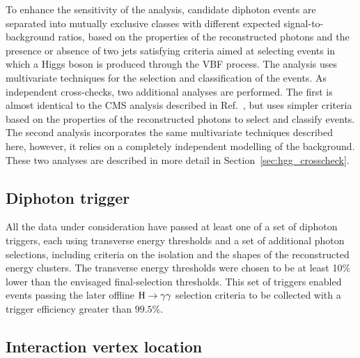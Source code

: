 \documentclass[12pt,twoside,a4paper,cmspaper,final,collab]{cms-tdr}
\begin{document}
To enhance the sensitivity of the analysis, candidate diphoton events are separated into mutually
exclusive classes with different expected signal-to-background ratios,
based on the properties of the reconstructed photons and
the presence or absence of two jets satisfying criteria aimed at selecting events
in which a Higgs boson is produced through the VBF process.
The analysis uses multivariate techniques
for the selection and classification of the events.
As independent cross-checks, two additional analyses are performed.
The first is almost identical to the CMS analysis described in Ref.~\cite{Chatrchyan:2012tw},
but uses simpler criteria based on the properties of the reconstructed photons to
select and classify events. The second analysis incorporates the same multivariate techniques
described here, however, it relies on a completely independent modelling of the background.
These two analyses are described in more detail in Section~\ref{sec:hgg_crosscheck}.



\subsection{Diphoton trigger}
\label{sec:hgg_dataReco}

All the data under consideration have passed at least one of a set of
diphoton triggers, each using transverse energy thresholds and
a set of additional photon selections, including criteria on the isolation and the shapes
of the reconstructed energy clusters. The transverse energy thresholds were chosen to be at least
10\% lower than the envisaged final-selection thresholds. This set of triggers
enabled events passing the later offline $\mathrm{H} \to \gamma\gamma$ selection criteria
to be collected with a trigger  efficiency greater than  $99.5\%$.


\subsection{Interaction vertex location}
\label{sec:hgg_vertex}
\end{document}
